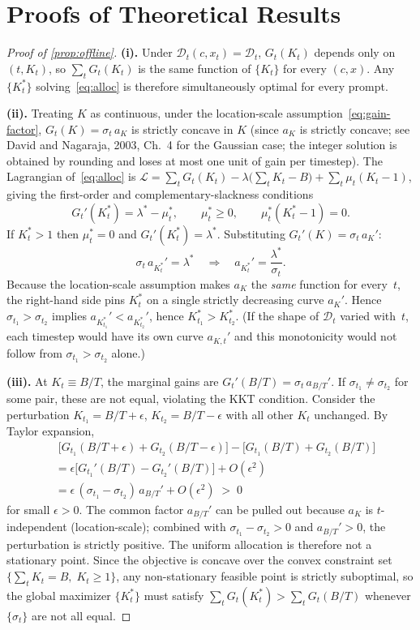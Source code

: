 \section{Proofs of Theoretical Results}
\label{sec:proofs}

\begin{proof}[Proof of \cref{prop:offline}]
\textbf{(i).}\;
Under $\mathcal{D}_t(c,x_t)=\mathcal{D}_t$,
$G_t(K_t)$ depends only on $(t,K_t)$, so
$\sum_t G_t(K_t)$ is the same function of $\{K_t\}$ for every $(c,x)$.
Any $\{K_t^*\}$ solving~\eqref{eq:alloc} is therefore simultaneously
optimal for every prompt.

\textbf{(ii).}\;
Treating $K$ as continuous,
under the location-scale assumption~\eqref{eq:gain-factor},
$G_t(K)=\sigma_t\,a_K$ is strictly concave in $K$
(since $a_K$ is strictly concave; see David and Nagaraja, 2003,
Ch.~4 for the Gaussian case; the integer solution is obtained by
rounding and loses at most one unit of gain per timestep).
The Lagrangian of~\eqref{eq:alloc} is
$\mathcal{L}=\sum_t G_t(K_t)-\lambda\bigl(\sum_t K_t - B\bigr)
+\sum_t \mu_t(K_t-1)$,
giving the first-order and complementary-slackness conditions
\[
  G_t'(K_t^*)=\lambda^*-\mu_t^*,
  \qquad
  \mu_t^*\ge 0,
  \qquad
  \mu_t^*(K_t^*-1)=0.
\]
If $K_t^*>1$ then $\mu_t^*=0$ and $G_t'(K_t^*)=\lambda^*$.
Substituting $G_t'(K)=\sigma_t\,a_K'$:
\[
  \sigma_t\,a_{K_t^*}' = \lambda^*
  \quad\Longrightarrow\quad
  a_{K_t^*}' = \frac{\lambda^*}{\sigma_t}.
\]
Because the location-scale assumption makes $a_K$ the \emph{same}
function for every~$t$, the right-hand side pins $K_t^*$ on a single
strictly decreasing curve $a_K'$.
Hence $\sigma_{t_1}>\sigma_{t_2}$
implies $a_{K_{t_1}^*}' < a_{K_{t_2}^*}'$, hence $K_{t_1}^*>K_{t_2}^*$.
(If the shape of $\mathcal{D}_t$ varied with~$t$, each timestep would
have its own curve $a_{K,t}'$ and this monotonicity would not follow
from $\sigma_{t_1}>\sigma_{t_2}$ alone.)

\textbf{(iii).}\;
At $K_t\equiv B/T$, the marginal gains are
$G_t'(B/T)=\sigma_t\,a_{B/T}'$.
If $\sigma_{t_1}\neq\sigma_{t_2}$ for some pair, these are not equal,
violating the KKT condition.
Consider the perturbation $K_{t_1}=B/T+\epsilon$,
$K_{t_2}=B/T-\epsilon$ with all other $K_t$ unchanged.
By Taylor expansion,
\begin{align*}
  &\;\bigl[G_{t_1}(B/T+\epsilon)+G_{t_2}(B/T-\epsilon)\bigr]
   -\bigl[G_{t_1}(B/T)+G_{t_2}(B/T)\bigr] \\
  &= \epsilon\bigl[G_{t_1}'(B/T)-G_{t_2}'(B/T)\bigr]+O(\epsilon^2) \\
  &= \epsilon\,(\sigma_{t_1}-\sigma_{t_2})\,a_{B/T}'+O(\epsilon^2)
   \;>\;0
\end{align*}
for small $\epsilon>0$.
The common factor $a_{B/T}'$ can be pulled out because $a_K$ is
$t$-independent (location-scale); combined with
$\sigma_{t_1}-\sigma_{t_2}>0$ and $a_{B/T}'>0$, the perturbation
is strictly positive.
The uniform allocation is therefore not a stationary point.
Since the objective is concave over the convex constraint set
$\{\sum_t K_t=B,\;K_t\ge 1\}$, any non-stationary feasible point
is strictly suboptimal, so the global maximizer $\{K_t^*\}$
must satisfy $\sum_t G_t(K_t^*)>\sum_t G_t(B/T)$ whenever
$\{\sigma_t\}$ are not all equal.
\end{proof}

